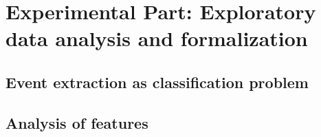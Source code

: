 \chapter{Experimental Part: Exploratory data analysis and formalization}
\label{chap:dataexplore}
\section{Event extraction as classification problem}
\section{Analysis of features}